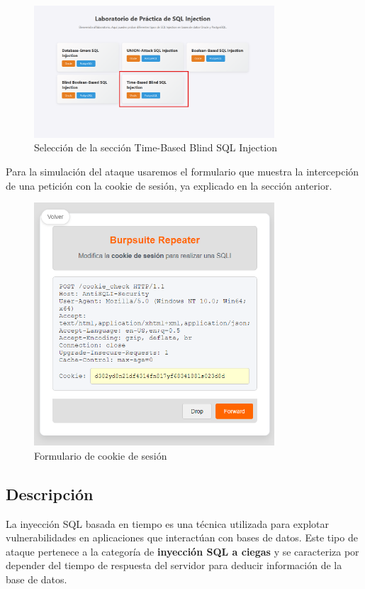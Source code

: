 \documentclass[a4paper,12pt]{article}
\begin{document}
\begin{figure}[H]
    \centering
    \includegraphics[width=0.8\textwidth]{Imagenes/time_blind1.png}
    \caption{Selección de la sección Time-Based Blind SQL Injection}
\end{figure}

Para la simulación del ataque usaremos el formulario que muestra la intercepción de una petición con la cookie de sesión, ya explicado en la sección anterior.
 
\begin{figure}[H]
    \centering
    \includegraphics[width=0.8\textwidth]{Imagenes/blind3.png}
    \caption{Formulario de cookie de sesión}
\end{figure}


\subsection{Descripción}

La inyección SQL basada en tiempo es una técnica utilizada para explotar vulnerabilidades en aplicaciones que interactúan con bases de datos. Este tipo de ataque pertenece a la categoría de \textbf{inyección SQL a ciegas} y se caracteriza por depender del tiempo de respuesta del servidor para deducir información de la base de datos.
\end{document}
